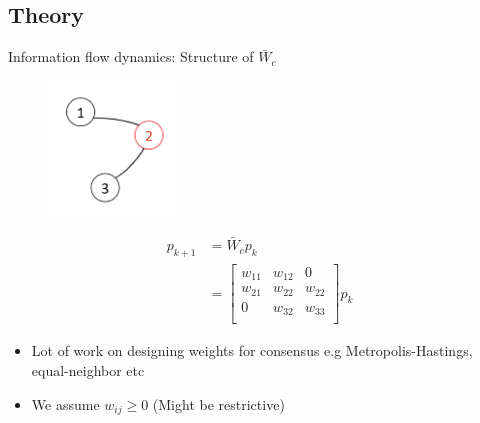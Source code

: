 \subsection{Theory}
\begin{frame}{Information flow dynamics: Structure of $\bar{W}_c$}
\begin{figure}
	\includegraphics[width=0.3\textwidth]{figures/info_dyn_example.png}
\end{figure}
\begin{equation*}
\begin{split}
p_{k+1}&=\bar{W}_cp_k\\
&=\begin{bmatrix}
w_{11} & w_{12}&0\\
w_{21} & w_{22}&w_{22}\\
0 & w_{32}&w_{33}\\
\end{bmatrix}p_k
\end{split}
\end{equation*}
\begin{itemize}
\item Lot of work on designing weights for consensus e.g Metropolis-Hastings, equal-neighbor etc
\item We assume $w_{ij}\geq 0$ (Might be restrictive)
\end{itemize}
\end{frame}
